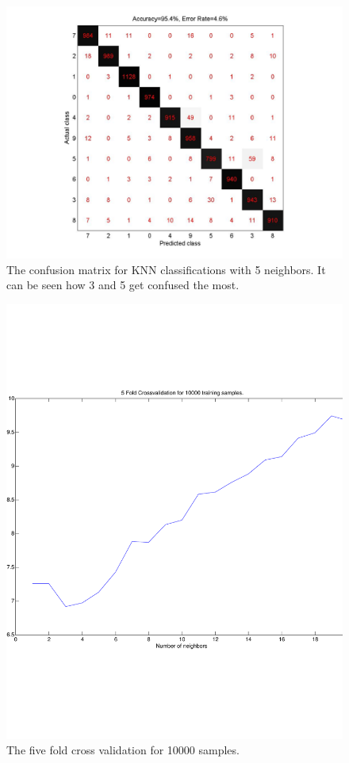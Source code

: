 \begin{figure}[H]
\centering
\includegraphics[width=\linewidth]{code/confusm_k5}
\caption{The confusion matrix for KNN classifications with 5 neighbors. It can be seen how 3 and 5 get confused the most.\label{fig:knn}}
\end{figure}
\begin{figure}[H]
\centering
\includegraphics[width=0.6\linewidth, trim= 0mm 30mm 0mm 30mm, clip]{code/5fold_knn_10000samples}
\caption{The five fold cross validation for 10000 samples.\label{fig:knn_small}}
\end{figure}
